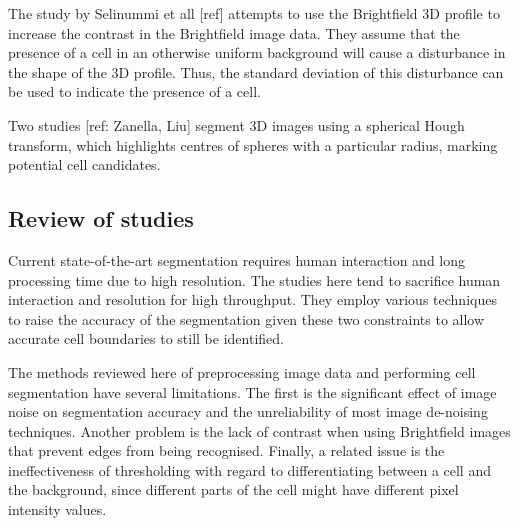 The study by Selinummi et all [ref] attempts to use the Brightfield 3D profile to increase the contrast in the Brightfield image data. They assume that the presence of a cell in an otherwise uniform background will cause a disturbance in the shape of the 3D profile. Thus, the standard deviation of this disturbance can be used to indicate the presence of a cell.

Two studies [ref: Zanella, Liu] segment 3D images using a spherical Hough transform, which highlights centres of spheres with a particular radius, marking potential cell candidates.

\subsection{Review of studies}

Current state-of-the-art segmentation requires human interaction and long processing time due to high resolution. The studies here tend to sacrifice human interaction and resolution for high throughput. They employ various techniques to raise the accuracy of the segmentation given these two constraints to allow accurate cell boundaries to still be identified.

The methods reviewed here of preprocessing image data and performing cell segmentation have several limitations. The first is the significant effect of image noise on segmentation accuracy and the unreliability of most image de-noising techniques. Another problem is the lack of contrast when using Brightfield images that prevent edges from being recognised. Finally, a related issue is the ineffectiveness of thresholding with regard to differentiating between a cell and the background, since different parts of the cell might have different pixel intensity values.
